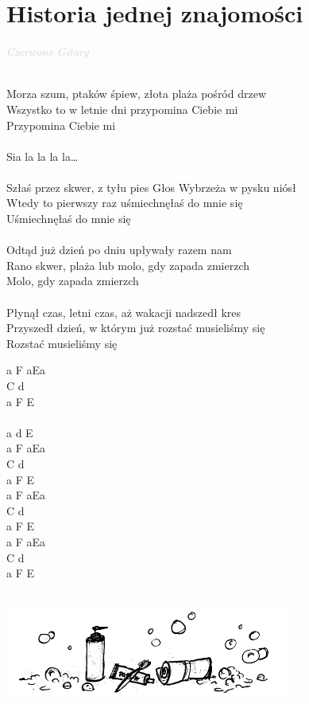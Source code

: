 \documentclass[a5paper, 10pt]{book}
\begin{document}
\newpage
\section{Historia jednej znajomości}\textcolor{lightgray}{\textit{Czerwone Gitary}}\\~\\
\begin{minipage}[t]{0.8\textwidth}
  Morza szum, ptaków śpiew, złota plaża pośród drzew\\
  Wszystko to w letnie dni przypomina Ciebie mi\\
  Przypomina Ciebie mi\\
  \\
  \hspace*{5mm}Sia la la la la…\\
  \\
  Szłaś przez skwer, z tyłu pies Głos Wybrzeża w pysku niósł\\
  Wtedy to pierwszy raz uśmiechnęłaś do mnie się\\
  Uśmiechnęłaś do mnie się\\
  \\
  Odtąd już dzień po dniu upływały razem nam\\
  Rano skwer, plaża lub molo, gdy zapada zmierzch\\
  Molo, gdy zapada zmierzch\\
  \\
  Płynął czas, letni czas, aż wakacji nadszedł kres\\
  Przyszedł dzień, w którym już rozstać musieliśmy się\\
  Rozstać musieliśmy się\\
\end{minipage}
\begin{minipage}[t]{0.2\textwidth}
  a F aEa\\
  C d\\
  a F E\\
  \\
  a d E\\

  a F aEa\\
  C d\\
  a F E\\

  a F aEa\\
  C d\\
  a F E\\

  a F aEa\\
  C d\\
  a F E\\
\end{minipage}
\vspace*{2cm}\\
\includegraphics[width = 0.7\textwidth, center]{images/historia_jednej_znajomosci.png}\\
\end{document}
